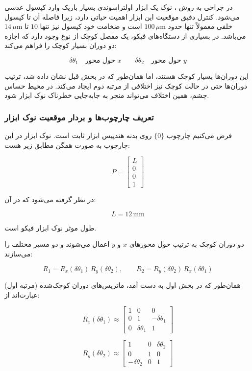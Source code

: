 \documentclass{article}
\begin{document}
در جراحی  به روش ، نوک یک ابزار اولتراسوندی بسیار باریک وارد کپسول عدسی می‌شود. کنترل دقیق موقعیت این ابزار اهمیت حیاتی دارد، زیرا فاصله آن تا کپسول خلفی معمولاً تنها حدود $100\,\mu\text{m}$ است و ضخامت خود کپسول نیز تنها $10$ تا $14\,\mu\text{m}$ می‌باشد. در بسیاری از دستگاه‌های فیکو، یک مفصل کوچک از نوع  وجود دارد که اجازه دو دوران بسیار کوچک را فراهم می‌کند:  

\[
\delta\theta_1 \quad \text{حول محور } x
\qquad
\delta\theta_2 \quad \text{حول محور } y
\]

این دوران‌ها بسیار کوچک هستند، اما همان‌طور که در بخش قبل نشان داده شد، ترتیب دوران‌ها حتی در حالت کوچک نیز اختلافی از مرتبه دوم ایجاد می‌کند. در محیط حساس چشم، همین اختلاف می‌تواند منجر به جابه‌جایی خطرناک نوک ابزار شود.

\subsubsection{تعریف چارچوب‌ها و بردار موقعیت نوک ابزار}

فرض می‌کنیم چارچوب $\{0\}$ روی بدنه هندپیس ابزار ثابت است. نوک ابزار در این چارچوب به صورت همگن مطابق زیر هست:

\[
P = \begin{bmatrix} L \\ 0 \\ 0 \\ 1 \end{bmatrix}
\]

در نظر گرفته می‌شود که در آن:

\[
L = 12\,\text{mm}
\]

طول موثر نوک ابزار فیکو است.

دو دوران کوچک به ترتیب حول محورهای $x$ و $y$ اعمال می‌شوند و دو مسیر مختلف را می‌سازند:

\[
R_1 = R_x(\delta\theta_1)\,R_y(\delta\theta_2),
\qquad
R_2 = R_y(\delta\theta_2)\,R_x(\delta\theta_1)
\]

همان‌طور که در بخش اول به دست آمد، ماتریس‌های دوران کوچک‌شده (مرتبه اول) عبارت‌اند از:

\[
R_x(\delta\theta_1)\approx
\begin{bmatrix}
	1 & 0 & 0\\
	0 & 1 & -\delta\theta_1\\
	0 & \delta\theta_1 & 1
\end{bmatrix}
\]

\[
R_y(\delta\theta_2)\approx
\begin{bmatrix}
	1 & 0 & \delta\theta_2\\
	0 & 1 & 0\\
	-\delta\theta_2 & 0 & 1
\end{bmatrix}
\]
\end{document}
